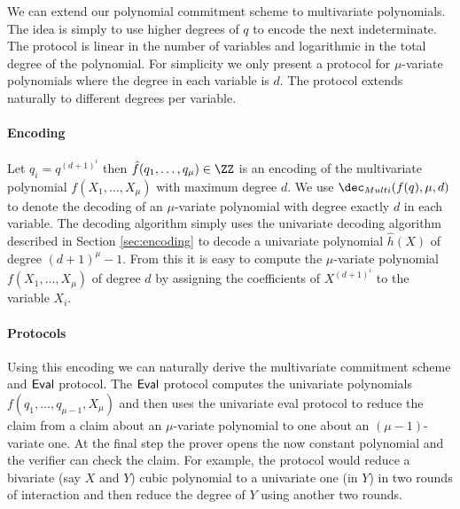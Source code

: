 
We can extend our polynomial commitment scheme to multivariate polynomials. The idea is simply to use higher degrees of $q$ to encode the next indeterminate. The protocol is linear in the number of variables and logarithmic in the total degree of the polynomial. For simplicity we only present a protocol for $\mu$-variate polynomials where the degree in each variable is $d$. The protocol extends naturally to different degrees per variable.

\paragraph{Encoding}
Let $q_i=q^{(d+1)^i}$ then $\hat{f}(q_1,\dots,q_\mu)\in \ZZ$ is an encoding of the multivariate polynomial $f(X_1,\dots,X_\mu)$ with maximum degree $d$. We use $\dec_{Multi}(f(q),\mu,d)$ to denote the decoding of an $\mu$-variate polynomial with degree exactly $d$ in each variable. The decoding algorithm simply uses the univariate decoding algorithm described in Section \ref{sec:encoding} to decode a univariate polynomial $\hat{h}(X)$ of degree $(d+1)^{\mu}-1$. From this it is easy to compute the $\mu$-variate polynomial $f(X_1,\dots,X_\mu)$ of degree $d$ by assigning the coefficients of $X^{(d+1)^i}$ to the variable $X_i$.
\paragraph{Protocols}
 Using this encoding we can naturally derive the multivariate commitment scheme and $\textsf{{Eval}}$ protocol. The $\textsf{{Eval}}$ protocol computes the univariate polynomials $f(q_1,\dots,q_{\mu-1},X_\mu)$ and then uses the univariate eval protocol to reduce the claim from a claim about an $\mu$-variate polynomial to one about an $(\mu-1)$-variate one. At the final step the prover opens the now constant polynomial and the verifier can check the claim. For example, the protocol would reduce a bivariate (say $X$ and $Y$) cubic polynomial to a univariate one (in $Y$) in two rounds of interaction and then reduce the degree of $Y$ using another two rounds.
 
